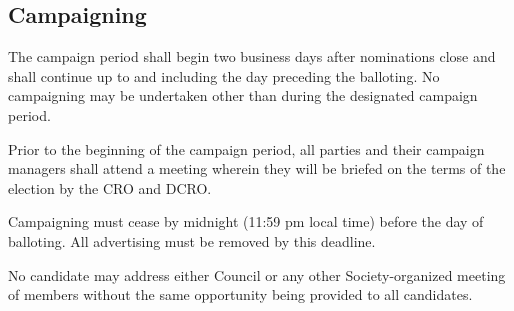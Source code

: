 \subsection{Campaigning}
\begin{longenum}[ label*=\thesubsection.\arabic*., align=left]
	\item The campaign period shall begin two business days after nominations close and shall continue up to and including the day preceding the balloting. No campaigning may be undertaken other than during the designated campaign period.
    \item Prior to the beginning of the campaign period, all parties and their campaign managers shall attend a meeting wherein they will be briefed on the terms of the election by the CRO and DCRO.
    \item Campaigning must cease by midnight (11:59 pm local time) before the day of balloting. All advertising must be removed by this deadline. 
    \item No candidate may address either Council or any other Society-organized meeting of members without the same opportunity being provided to all candidates.
\end{longenum}

